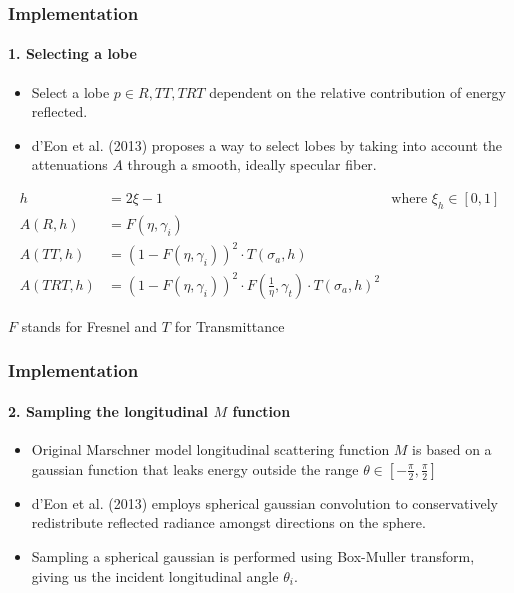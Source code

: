\documentclass{beamer}
\begin{document}
  
  \begin{frame}
    \frametitle{Implementation}
    \framesubtitle{1. Selecting a lobe}
    
    \begin{itemize}
    \item Select a lobe $p \in {R, TT, TRT}$ dependent on the relative contribution of energy reflected.
    \item d'Eon et al. (2013) proposes a way to select lobes by taking into account the attenuations $A$ through a smooth, ideally specular fiber.
    \end{itemize}
    
    \begin{align*}
    h &= 2\xi - 1 &\textrm{where $\xi_h \in [0,1]$} \\
    A(R, h) &= F(\eta, \gamma_i) \\
    A(TT, h) &= (1 - F(\eta, \gamma_i))^2 \cdot T(\sigma_a, h) \\
    A(TRT, h) &= (1 - F(\eta, \gamma_i))^2 \cdot F(\frac{1}{\eta}, \gamma_t) \cdot T(\sigma_a, h)^2
    \end{align*}
    
    $F$ stands for Fresnel and $T$ for Transmittance
    
  \end{frame}
  
  \begin{frame}
  \frametitle{Implementation}
  \framesubtitle{2. Sampling the longitudinal $M$ function}

 \begin{itemize}
  \item Original Marschner model longitudinal scattering function $M$ is based on a gaussian function that leaks energy outside the range $\theta \in [-\frac{\pi}{2}, \frac{\pi}{2}]$
  \item d'Eon et al. (2013) employs spherical gaussian convolution to conservatively redistribute reflected radiance amongst directions on the sphere.
  \item Sampling a spherical gaussian is performed using Box-Muller transform, giving us the incident longitudinal angle $\theta_i$.
\end{itemize}


  \end{frame}
  
\end{document}
